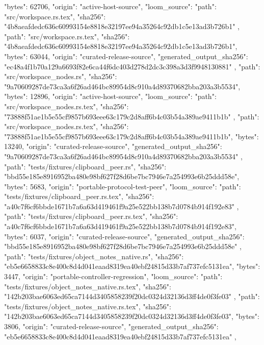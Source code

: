 {{      "bytes": 62706,
      "origin": "active-host-source",
      "loom_source": {
        "path": "src/workspace.rs.tex",
        "sha256": "4b8aeafdedc636c60993154e8818e32197ee94a35264c92db1c5e13ad3b726b1"
      }
    },
    {
      "path": "src/workspace.rs.tex",
      "sha256": "4b8aeafdedc636c60993154e8818e32197ee94a35264c92db1c5e13ad3b726b1",
      "bytes": 63044,
      "origin": "curated-release-source",
      "generated_output_sha256": "ec48a4f1b70a129a6693f82e6ca44f6dc403d278d2dc3c398a3d3f9948130881"
    },
    {
      "path": "src/workspace_nodes.rs",
      "sha256": "9a70609287de73ca3a6f26ad464bc89954d8c910a4d89370682bba203a3b5534",
      "bytes": 12896,
      "origin": "active-host-source",
      "loom_source": {
        "path": "src/workspace_nodes.rs.tex",
        "sha256": "73888f51ae1b5e55cf9857b693eee63c179c2d8aff6b4c03b54a389ae9411b1b"
      }
    },
    {
      "path": "src/workspace_nodes.rs.tex",
      "sha256": "73888f51ae1b5e55cf9857b693eee63c179c2d8aff6b4c03b54a389ae9411b1b",
      "bytes": 13240,
      "origin": "curated-release-source",
      "generated_output_sha256": "9a70609287de73ca3a6f26ad464bc89954d8c910a4d89370682bba203a3b5534"
    },
    {
      "path": "tests/fixtures/clipboard_peer.rs",
      "sha256": "bbd55e185e8916952ba480e98bf627f28d6be7bc7946e7a254993e6b25ddd58e",
      "bytes": 5683,
      "origin": "portable-protocol-test-peer",
      "loom_source": {
        "path": "tests/fixtures/clipboard_peer.rs.tex",
        "sha256": "a40c7f6cf6bbde1671b7a6a63d419461f9a25e522bb138b7d0784b914f192e83"
      }
    },
    {
      "path": "tests/fixtures/clipboard_peer.rs.tex",
      "sha256": "a40c7f6cf6bbde1671b7a6a63d419461f9a25e522bb138b7d0784b914f192e83",
      "bytes": 6037,
      "origin": "curated-release-source",
      "generated_output_sha256": "bbd55e185e8916952ba480e98bf627f28d6be7bc7946e7a254993e6b25ddd58e"
    },
    {
      "path": "tests/fixtures/object_notes_native.rs",
      "sha256": "eb5e6658833c8e400c8d4d041eaad8319ea40ebf24815d33b7af737efc5131ea",
      "bytes": 3447,
      "origin": "portable-controller-regression",
      "loom_source": {
        "path": "tests/fixtures/object_notes_native.rs.tex",
        "sha256": "142b203bae6063ed65ca7144d3405858239f20dc0324d32136d3ff4de0f3fe03"
      }
    },
    {
      "path": "tests/fixtures/object_notes_native.rs.tex",
      "sha256": "142b203bae6063ed65ca7144d3405858239f20dc0324d32136d3ff4de0f3fe03",
      "bytes": 3806,
      "origin": "curated-release-source",
      "generated_output_sha256": "eb5e6658833c8e400c8d4d041eaad8319ea40ebf24815d33b7af737efc5131ea"
    },
}
